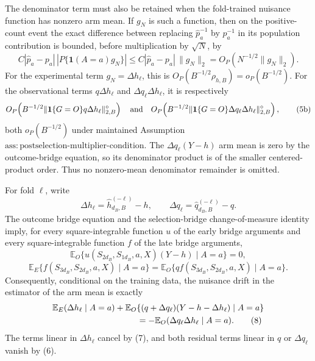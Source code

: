 The denominator term must also be retained when the fold-trained nuisance function has nonzero arm mean.  If \(g_N\) is such a function, then on the positive-count event the exact difference between replacing \(\widehat p_a^{-1}\) by \(p_a^{-1}\) in its population contribution is bounded, before multiplication by \(\sqrt N\), by
\[
 C|\widehat p_a-p_a|\,|P\{\mathbf1(A=a)g_N\}|
 \le C|\widehat p_a-p_a|\,\|g_N\|_2
 =O_P(N^{-1/2}\|g_N\|_2).                                \tag{5a}
\]
For the experimental term \(g_N=\Delta h_\ell\), this is \(O_P(B^{-1/2}\rho_{h,B})=o_P(B^{-1/2})\).  For the observational terms \(q\Delta h_\ell\) and \(\Delta q_\ell\Delta h_\ell\), it is respectively
\[
 O_P\!\left(B^{-1/2}\|\mathbf1\{G=O\}q\Delta h_\ell\|_{2,B}^{\circ}\right)
 \quad\hbox{and}\quad
 O_P\!\left(B^{-1/2}\|\mathbf1\{G=O\}\Delta q_\ell\Delta h_\ell\|_{2,B}^{\circ}\right), \tag{5b}
\]
both \(o_P(B^{-1/2})\) under maintained Assumption~\(\mathrm{ass{:}postselection\text{-}multiplier\text{-}condition}\).  The \(\Delta q_\ell(Y-h)\) arm mean is zero by the outcome-bridge equation, so its denominator product is of the smaller centered-product order.  Thus no nonzero-mean denominator remainder is omitted.

For fold \(\ell\), write
\[
 \Delta h_\ell=\widehat h_{d_B,B}^{(-\ell)}-h,
 \qquad
 \Delta q_\ell=\widehat q_{d_B,B}^{(-\ell)}-q.
\]
The outcome bridge equation and the selection-bridge change-of-measure identity imply, for every square-integrable function \(u\) of the early bridge arguments and every square-integrable function \(f\) of the late bridge arguments,
\[
 \mathbb E_O\{u(S_{2d_B},S_{1d_B},a,X)(Y-h)\mid A=a\}=0, \tag{6}
\]
\[
 \mathbb E_E\{f(S_{3d_B},S_{2d_B},a,X)\mid A=a\}
 =\mathbb E_O\{qf(S_{3d_B},S_{2d_B},a,X)\mid A=a\}.      \tag{7}
\]
Consequently, conditional on the training data, the nuisance drift in the estimator of the arm mean is exactly
\[
\begin{aligned}
 &\mathbb E_E(\Delta h_\ell\mid A=a)
 +\mathbb E_O\{(q+\Delta q_\ell)(Y-h-\Delta h_\ell)\mid A=a\}\\
 &\hspace{35mm}=-\mathbb E_O(\Delta q_\ell\Delta h_\ell\mid A=a). \tag{8}
\end{aligned}
\]
The terms linear in \(\Delta h_\ell\) cancel by (7), and both residual terms linear in \(q\) or \(\Delta q_\ell\) vanish by (6).

